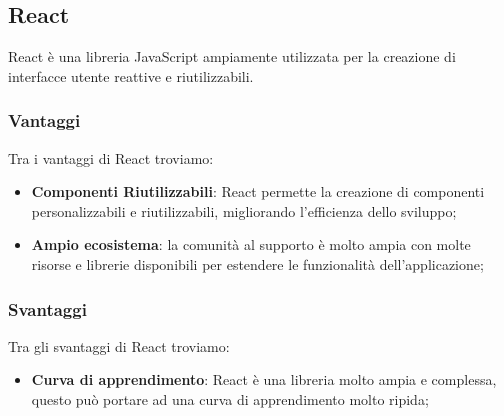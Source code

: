 \subsection*{React}
React è una libreria JavaScript ampiamente utilizzata per la creazione di interfacce utente reattive e riutilizzabili.

\subsubsection*{Vantaggi}
Tra i vantaggi di React troviamo:
\begin{itemize}
    \item \textbf{Componenti Riutilizzabili}: React permette la creazione di componenti personalizzabili e riutilizzabili, migliorando l'efficienza dello sviluppo;
    \item \textbf{Ampio ecosistema}: la comunità al supporto è molto ampia con molte risorse e librerie disponibili per estendere le funzionalità dell'applicazione;
\end{itemize}

\subsubsection*{Svantaggi}
Tra gli svantaggi di React troviamo:
\begin{itemize}
    \item \textbf{Curva di apprendimento}: React è una libreria molto ampia e complessa, questo può portare ad una curva di apprendimento molto ripida;
\end{itemize}

